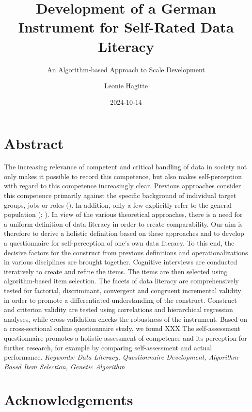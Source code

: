 \documentclass[
  12pt,
  a4paper,
  twoside]{article}
\title{Development of a German Instrument for Self-Rated Data Literacy}
\subtitle{An Algorithm-based Approach to Scale Development}
\author{Leonie Hagitte}
\date{2024-10-14}
\begin{document}
\maketitle

{
\setcounter{tocdepth}{2}
\tableofcontents
}
\newpage\null\thispagestyle{empty}\newpage

\section*{Abstract}\label{abstract}

The increasing relevance of competent and critical handling of data in society not only makes it possible to record this competence, but also makes self-perception with regard to this competence increasingly clear. Previous approaches consider this competence primarily against the specific background of individual target groups, jobs or roles (). In addition, only a few explicitly refer to the general population (; ). In view of the various theoretical approaches, there is a need for a uniform definition of data literacy in order to create comparability.
Our aim is therefore to derive a holistic definition based on these approaches and to develop a questionnaire for self-perception of one's own data literacy. To this end, the decisive factors for the construct from previous definitions and operationalizations in various disciplines are brought together. Cognitive interviews are conducted iteratively to create and refine the items. The items are then selected using algorithm-based item selection. The facets of data literacy are comprehensively tested for factorial, discriminant, convergent and congruent incremental validity in order to promote a differentiated understanding of the construct. Construct and criterion validity are tested using correlations and hierarchical regression analyses, while cross-validation checks the robustness of the instrument.
Based on a cross-sectional online questionnaire study, we found XXX
The self-assessment questionnaire promotes a holistic assessment of competence and its perception for further research, for example by comparing self-assessment and actual performance.
\emph{Keywords: Data Literacy, Questionnaire Development, Algorithm-Based Item Selection, Genetic Algorithm}

\section*{Acknowledgements}\label{acknowledgements}
\end{document}
